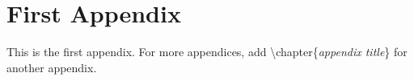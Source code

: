 \appendix
\chapter{First Appendix}
This is the first appendix. For more appendices, add \textbackslash chapter\{\textit{appendix title}\} for another appendix. 